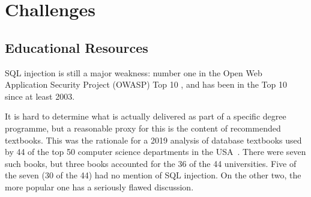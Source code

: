 \documentclass[a4paper,11pt]{article}
\begin{document}





\section*{Challenges} \label{sec}


\subsection*{Educational Resources}\label{sec:EDResource}

SQL injection is still a major weakness: number one in the Open Web Application Security Project (OWASP) Top 10 , and has been in the Top 10 since at least 2003. 

It is hard to determine what is actually delivered as part of a specific degree programme, but a reasonable proxy for this is the content of recommended textbooks. This was the rationale for a 2019 analysis of database textbooks used by 44 of the top 50 computer science departments in the USA~\cite{Drop2019}.  There were seven such books, but three books accounted for the 36 of the 44 universities. Five of the seven (30 of the 44) had no mention of SQL injection. On the other two, the more popular one has a seriously flawed discussion. 
\end{document}
